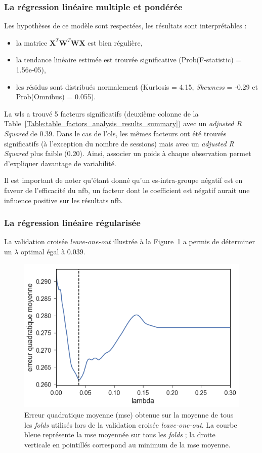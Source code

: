 \subsubsection{La régression linéaire multiple et pondérée}

Les hypothèses de ce modèle sont respectées, les résultats sont interprétables :
\begin{itemize}
	\item la matrice ${\textbf{X}}^{T}\textbf{W}^{T}\textbf{WX}$ est bien régulière,
  \item la tendance linéaire estimée est trouvée significative (Prob(F-statistic) = 1.56e-05),
  \item les résidus sont distribués normalement (Kurtosis = 4.15, \textit{Skewness} = -0.29 et Prob(Omnibus) = 0.055).
\end{itemize}

La \gls{wls} a trouvé 5 facteurs significatifs (deuxième colonne de la Table~\ref{Table:table_factors_analysis_results_summary}) avec un \textit{adjusted R Squared} de 0.39. 
Dans le cas de l'\gls{ols}, les mêmes facteurs ont été trouvés significatifs (à l'exception du nombre de sessions) mais avec un \textit{adjusted R Squared} plus faible (0.20). Ainsi, associer un poids
à chaque observation permet d'expliquer davantage de variabilité. 

Il est important de noter qu'étant donné qu'un \gls{es}-intra-groupe négatif est en faveur de l'efficacité du \gls{nfb},
un facteur dont le coefficient est négatif aurait une influence positive sur les résultats \gls{nfb}.


\subsubsection{La régression linéaire régularisée}

La validation croisée \textit{leave-one-out} illustrée à la Figure~\ref{Figure:selection_lambda_lasso} a permis de déterminer un $\lambda$ optimal égal à 0.039.
\begin{figure}[h!]
  \centering
	\includegraphics[width=0.7\linewidth]{figures/chapter-3/factors-selection-lasso-best-lambda} 
  \caption{Erreur quadratique moyenne (\gls{mse}) obtenue sur la moyenne de tous les \textit{folds} utilisés lors de la validation 
	croisée \textit{leave-one-out}. La courbe bleue représente la \gls{mse} moyennée sur tous les \textit{folds} ; la droite verticale en pointillés correspond
	au minimum de la \gls{mse} moyenne.}
  \label{Figure:selection_lambda_lasso}
\end{figure}

